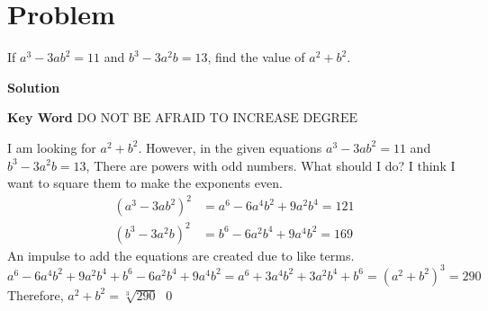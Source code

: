 \documentclass{article}
\newenvironment{solution}{\begin{trivlist}\item[]
{\bf Solution}}{\qed \end{trivlist}}
\begin{document}
\section*{Problem}
If $a^3 - 3ab^2 = 11$ and $b^3 - 3a^2b = 13$,
find the value of $a^2 + b^2$.
\begin{solution}

\textbf{Key Word} $\boxed{\text{DO NOT BE AFRAID
TO INCREASE DEGREE}}$


I am looking for $a^2 + b^2$. However, in the given
equations $a^3 - 3ab^2 = 11$ and $b^3 - 3a^2b = 13$,
There are powers with odd numbers. What should I do?
I think I want to square them to make the exponents even.
\begin{align*}
    (a^3 - 3ab^2)^2 &= a^6 - 6a^4 b^2 + 9a^2 b^4
    = 121 \\
    (b^3 - 3a^2b)^2 &= b^6 - 6a^2 b^4 + 9a^4 b^2 = 169
\end{align*}
An impulse to add the equations are created due to
like terms.
\[
a^6 - 6a^4 b^2 + 9a^2 b^4 + b^6 - 6a^2 b^4 + 9a^4 b^2
= a^6 + 3a^4 b^2 + 3a^2 b^4 + b^6
= (a^2 + b^2)^3 = 290
\]
Therefore, $a^2 + b^2 = \boxed{\sqrt[3]{290}}$
\end{solution}

\newpage
\end{document}
